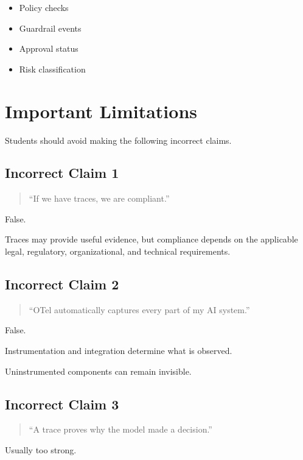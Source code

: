 \documentclass[11pt,a4paper]{article}
\begin{document}
\begin{itemize}
\item Policy checks
\item Guardrail events
\item Approval status
\item Risk classification
\end{itemize}

\section{Important Limitations}

Students should avoid making the following incorrect claims.

\subsection{Incorrect Claim 1}

\begin{quote}
``If we have traces, we are compliant.''
\end{quote}

False.

Traces may provide useful evidence, but compliance depends on the applicable legal, regulatory, organizational, and technical requirements.

\subsection{Incorrect Claim 2}

\begin{quote}
``OTel automatically captures every part of my AI system.''
\end{quote}

False.

Instrumentation and integration determine what is observed.

Uninstrumented components can remain invisible.

\subsection{Incorrect Claim 3}

\begin{quote}
``A trace proves why the model made a decision.''
\end{quote}

Usually too strong.
\end{document}
